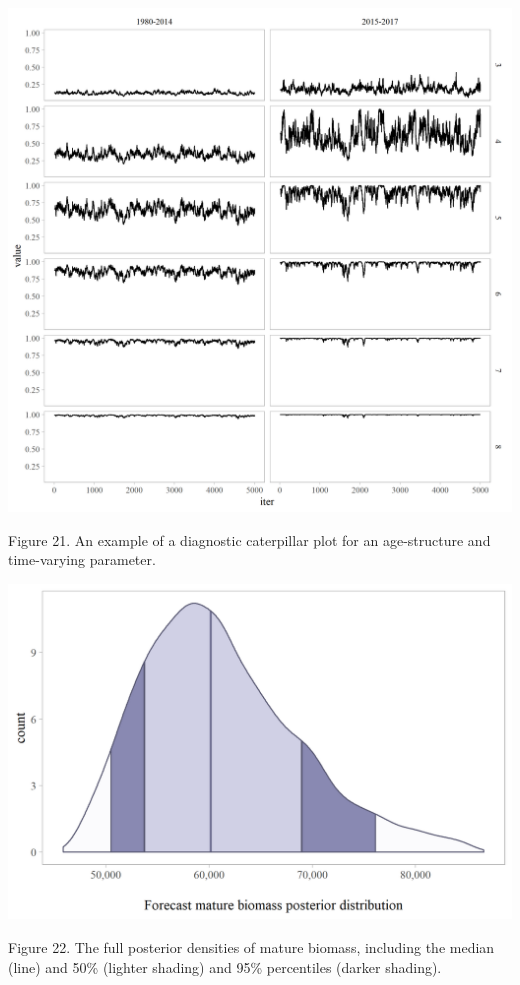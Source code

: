 \documentclass[]{article}
\begin{document}
\includegraphics[width=1\linewidth]{../../HER/figs/HER/caterpillar_mat}

Figure 21. An example of a diagnostic caterpillar plot for an
age-structure and time-varying parameter.

\includegraphics[width=1\linewidth]{../../HER/figs/HER/posterior_forematb}

Figure 22. The full posterior densities of mature biomass, including the
median (line) and 50\% (lighter shading) and 95\% percentiles (darker
shading).
\end{document}
